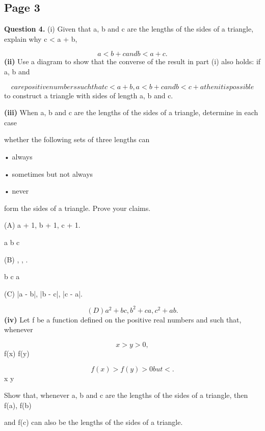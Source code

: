 \documentclass[12pt]{article}
\begin{document}
\subsection*{Page 3}
\begin{flushleft}
\bigskip\textbf{Question 4.} (i) Given that a, b and c are the lengths of the sides of a triangle, explain why c < a + b,\par
\[a < b + c and b < a + c.\]
\textbf{(ii)} Use a diagram to show that the converse of the result in part (i) also holds: if a, b and\par
\[c are positive numbers such that c < a + b, a < b + c and b < c + a then it is possible\]
to construct a triangle with sides of length a, b and c.\par
\textbf{(iii)} When a, b and c are the lengths of the sides of a triangle, determine in each case\par
whether the following sets of three lengths can\par
• always\par
• sometimes but not always\par
• never\par
form the sides of a triangle. Prove your claims.\par
(A) a + 1, b + 1, c + 1.\par
a b c\par
(B) , , .\par
b c a\par
(C) |a - b|, |b - c|, |c - a|.\par
\[(D) a^2 + bc, b^2 + ca, c^2 + ab.\]
\textbf{(iv)} Let f be a function defined on the positive real numbers and such that, whenever\par
\[x > y > 0,\]
f(x) f(y)\par
\[f(x) > f(y) > 0 but < .\]
x y\par
Show that, whenever a, b and c are the lengths of the sides of a triangle, then f(a), f(b)\par
and f(c) can also be the lengths of the sides of a triangle.\par
\end{flushleft}
\end{document}
